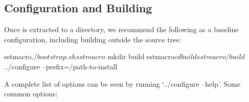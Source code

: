 \subsection{Configuration and Building}
\label{subsec:build:configure}

Once \sstmacro is extracted to a directory, we recommend the following as a baseline configuration, including building outside the source tree:

\begin{ShellCmd}
sstmacro$ ./bootstrap.sh
sstmacro$ mkdir build
sstmacro$ cd build
sstmacro/build$ ../configure --prefix=/path-to-install 
\end{ShellCmd}


A complete list of options can be seen by running `../configure --help'.   Some common options:

